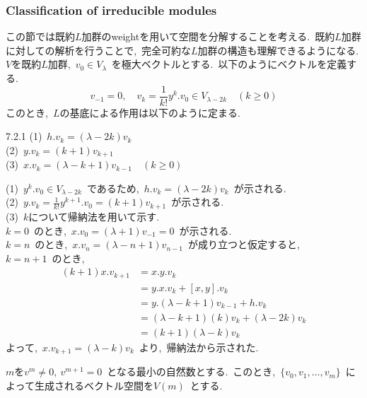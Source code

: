 \documentclass[uplatex,dvipdfmx]{jsarticle}
\begin{document}
\subsubsection{Classification of irreducible modules}
この節では既約$L$加群のweightを用いて空間を分解することを考える.~既約$L$加群に対しての解析を行うことで,~完全可約な$L$加群の構造も理解できるようになる.\\
$V$を既約$L$加群,~$v_0 \in V_{\lambda}$~を極大ベクトルとする.~以下のようにベクトルを定義する.
\begin{equation*}
    v_{-1} = 0, \quad v_k = \frac{1}{k!} y^k . v_0 \in V_{\lambda - 2k} \quad (k\geq 0)
\end{equation*}
このとき,~$L$の基底による作用は以下のように定まる.
\begin{mylemma}{7.2.1}
    (1)~$h.v_k = (\lambda - 2k) v_k$\\
    (2)~$y.v_k = (k+1) v_{k+1}$\\
    (3)~$x.v_k = (\lambda - k + 1) v_{k-1}$~~$(k \geq 0)$\\
\end{mylemma}
\begin{myproof}
    (1)~$y^k.v_0 \in V_{\lambda - 2k}$~であるため,~$h.v_k = (\lambda - 2k) v_k$~が示される.\\
    (2)~$y.v_k = \frac{1}{k!} y^{k+1}.v_0 = (k+1) v_{k+1}$~が示される.\\
    (3)~$k$について帰納法を用いて示す.\\
    $k = 0$~のとき,~$x.v_0 = (\lambda + 1) v_{-1} = 0$~が示される.\\
    $k=n$~のとき,~$x.v_n = (\lambda - n + 1) v_{n-1}$~が成り立つと仮定すると,\\
    $k= n+1$~のとき,
    \begin{equation*}
        \begin{split}
            (k+1)x.v_{k+1} &= x.y.v_k \\
            &= y.x.v_k + [x,y].v_k \\
            &= y.(\lambda - k + 1) v_{k-1} + h.v_k \\
            &= (\lambda - k + 1)(k) v_k + (\lambda - 2k) v_k \\
            &= (k+1)(\lambda - k) v_k
        \end{split}
    \end{equation*}
    よって,~$x.v_{k+1} = (\lambda - k) v_k$~より,~帰納法から示された.
\end{myproof}
$m$を$v^m \neq 0,~v^{m+1} = 0$~となる最小の自然数とする.~このとき,~$\{v_0, v_1, \ldots, v_m\}$~によって生成されるベクトル空間を$V(m)$~とする.\\
\end{document}

